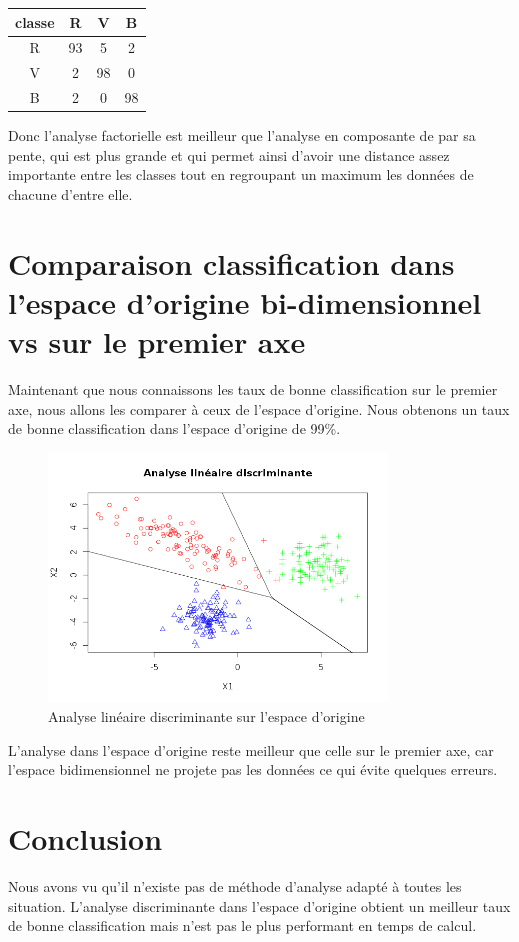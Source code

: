 \documentclass[a4paper,11pt]{article}
\begin{document}
  \begin{center}
  \begin{tabular}{|c|c|c|c|}
   \hline
   classe & R & V & B\\
   \hline
   R & 93 & 5 & 2 \\
   \hline
   V & 2 & 98 & 0 \\
   \hline
   B & 2 & 0 & 98 \\
   \hline
  \end{tabular}
  \end{center}
  
  Donc l'analyse factorielle est meilleur que l'analyse en composante de par sa pente, qui est plus
  grande et qui permet ainsi d'avoir une distance assez importante entre les classes tout en
  regroupant un maximum les données de chacune d'entre elle.
  
  \section{Comparaison classification dans l'espace d'origine bi-dimensionnel vs sur le premier axe}
  Maintenant que nous connaissons les taux de bonne classification sur le premier axe, nous allons
  les comparer à ceux de l'espace d'origine. Nous obtenons un taux de bonne classification dans l'espace
  d'origine de 99\%.
  
   \begin{figure}[H]
    \center
   \includegraphics[width=9cm]{analyse_lin_test.png}
    \caption{Analyse linéaire discriminante sur l'espace d'origine}
  \end{figure}
  
  L'analyse dans l'espace d'origine reste meilleur que celle sur le premier axe, car l'espace bidimensionnel
  ne projete pas les données ce qui évite quelques erreurs.
  
  \section{Conclusion}
  Nous avons vu qu'il n'existe pas de méthode d'analyse adapté à toutes les situation. L'analyse discriminante dans 
  l'espace d'origine obtient un meilleur taux de bonne classification mais n'est pas le plus performant en temps
  de calcul.
  
\end{document}
